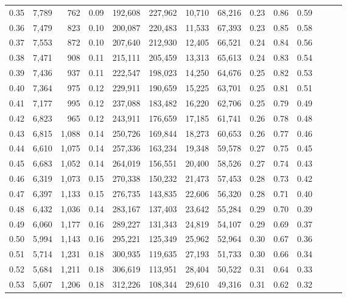 \begin{tabular}{rrrrrrrrrrrrrr}
0.35 &  7,789 &    762 &  0.09 &  192,608 &  227,962 &  10,710 &  68,216 &  0.23 &  0.86 &      0.59 \\
0.36 &  7,479 &    823 &  0.10 &  200,087 &  220,483 &  11,533 &  67,393 &  0.23 &  0.85 &      0.58 \\
0.37 &  7,553 &    872 &  0.10 &  207,640 &  212,930 &  12,405 &  66,521 &  0.24 &  0.84 &      0.56 \\
0.38 &  7,471 &    908 &  0.11 &  215,111 &  205,459 &  13,313 &  65,613 &  0.24 &  0.83 &      0.54 \\
0.39 &  7,436 &    937 &  0.11 &  222,547 &  198,023 &  14,250 &  64,676 &  0.25 &  0.82 &      0.53 \\
0.40 &  7,364 &    975 &  0.12 &  229,911 &  190,659 &  15,225 &  63,701 &  0.25 &  0.81 &      0.51 \\
0.41 &  7,177 &    995 &  0.12 &  237,088 &  183,482 &  16,220 &  62,706 &  0.25 &  0.79 &      0.49 \\
0.42 &  6,823 &    965 &  0.12 &  243,911 &  176,659 &  17,185 &  61,741 &  0.26 &  0.78 &      0.48 \\
0.43 &  6,815 &  1,088 &  0.14 &  250,726 &  169,844 &  18,273 &  60,653 &  0.26 &  0.77 &      0.46 \\
0.44 &  6,610 &  1,075 &  0.14 &  257,336 &  163,234 &  19,348 &  59,578 &  0.27 &  0.75 &      0.45 \\
0.45 &  6,683 &  1,052 &  0.14 &  264,019 &  156,551 &  20,400 &  58,526 &  0.27 &  0.74 &      0.43 \\
0.46 &  6,319 &  1,073 &  0.15 &  270,338 &  150,232 &  21,473 &  57,453 &  0.28 &  0.73 &      0.42 \\
0.47 &  6,397 &  1,133 &  0.15 &  276,735 &  143,835 &  22,606 &  56,320 &  0.28 &  0.71 &      0.40 \\
0.48 &  6,432 &  1,036 &  0.14 &  283,167 &  137,403 &  23,642 &  55,284 &  0.29 &  0.70 &      0.39 \\
0.49 &  6,060 &  1,177 &  0.16 &  289,227 &  131,343 &  24,819 &  54,107 &  0.29 &  0.69 &      0.37 \\
0.50 &  5,994 &  1,143 &  0.16 &  295,221 &  125,349 &  25,962 &  52,964 &  0.30 &  0.67 &      0.36 \\
0.51 &  5,714 &  1,231 &  0.18 &  300,935 &  119,635 &  27,193 &  51,733 &  0.30 &  0.66 &      0.34 \\
0.52 &  5,684 &  1,211 &  0.18 &  306,619 &  113,951 &  28,404 &  50,522 &  0.31 &  0.64 &      0.33 \\
0.53 &  5,607 &  1,206 &  0.18 &  312,226 &  108,344 &  29,610 &  49,316 &  0.31 &  0.62 &      0.32 \\

\end{tabular}

